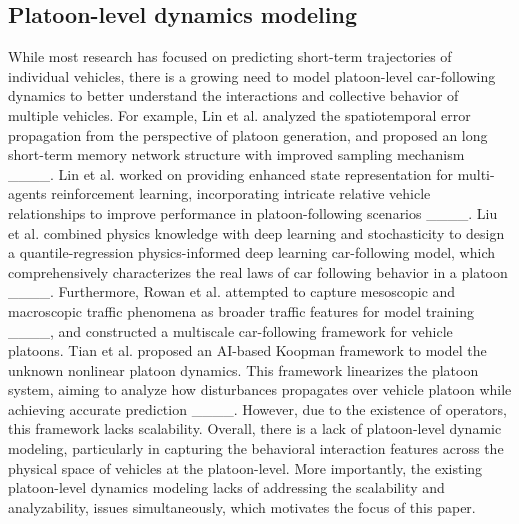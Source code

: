 \subsection{Platoon-level dynamics modeling}
While most research has focused on predicting short-term trajectories of individual vehicles, there is a growing need to model platoon-level car-following dynamics to better understand the interactions and collective behavior of multiple vehicles. For example, Lin et al. analyzed the spatiotemporal error propagation from the perspective of platoon generation, and proposed an long short-term memory network structure with improved sampling mechanism ____. Lin et al. worked on providing enhanced state representation for multi-agents reinforcement learning, incorporating intricate relative vehicle relationships to improve performance in platoon-following scenarios ____. Liu et al. combined physics knowledge with deep learning and stochasticity to design a quantile-regression physics-informed deep learning car-following model, which comprehensively characterizes the real laws of car following behavior in a platoon ____. Furthermore, Rowan et al. attempted to capture mesoscopic and macroscopic traffic phenomena as broader traffic features for model training ____, and constructed a multiscale car-following framework for vehicle platoons. Tian et al. proposed an AI-based Koopman framework to model the unknown nonlinear platoon dynamics. This framework linearizes the platoon system, aiming to analyze how disturbances propagates over vehicle platoon while achieving accurate prediction ____. However, due to the existence of operators, this framework lacks scalability. Overall, there is a lack of platoon-level dynamic modeling, particularly in capturing the behavioral interaction features across the physical space of vehicles at the platoon-level. More importantly, the existing platoon-level dynamics modeling lacks of addressing the scalability and analyzability, issues simultaneously, which motivates the focus of this paper.